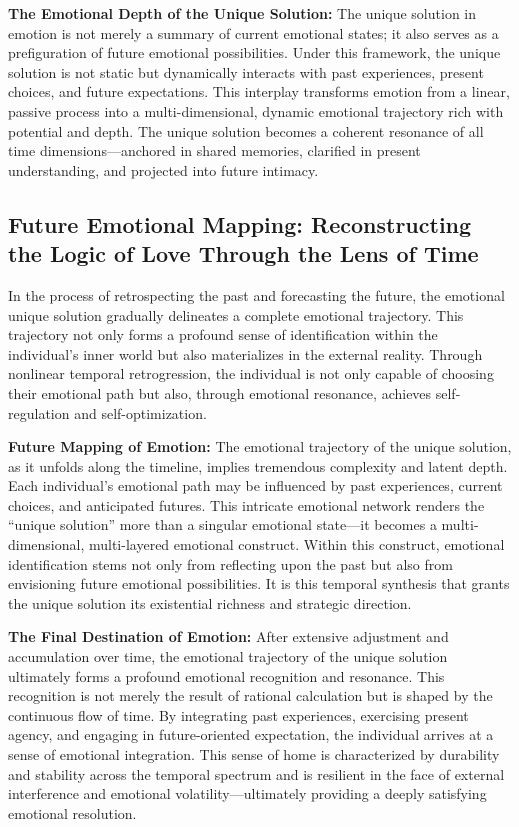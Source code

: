 \documentclass[12pt]{article}
\begin{document}
\textbf{The Emotional Depth of the Unique Solution:} The unique solution in emotion is not merely a summary of current emotional states; it also serves as a prefiguration of future emotional possibilities. Under this framework, the unique solution is not static but dynamically interacts with past experiences, present choices, and future expectations. This interplay transforms emotion from a linear, passive process into a multi-dimensional, dynamic emotional trajectory rich with potential and depth. The unique solution becomes a coherent resonance of all time dimensions—anchored in shared memories, clarified in present understanding, and projected into future intimacy.
\subsection{Future Emotional Mapping: Reconstructing the Logic of Love Through the Lens of Time}

In the process of retrospecting the past and forecasting the future, the emotional unique solution gradually delineates a complete emotional trajectory. This trajectory not only forms a profound sense of identification within the individual's inner world but also materializes in the external reality. Through nonlinear temporal retrogression, the individual is not only capable of choosing their emotional path but also, through emotional resonance, achieves self-regulation and self-optimization.

\textbf{Future Mapping of Emotion:} The emotional trajectory of the unique solution, as it unfolds along the timeline, implies tremendous complexity and latent depth. Each individual’s emotional path may be influenced by past experiences, current choices, and anticipated futures. This intricate emotional network renders the ``unique solution'' more than a singular emotional state—it becomes a multi-dimensional, multi-layered emotional construct. Within this construct, emotional identification stems not only from reflecting upon the past but also from envisioning future emotional possibilities. It is this temporal synthesis that grants the unique solution its existential richness and strategic direction.

\textbf{The Final Destination of Emotion:} After extensive adjustment and accumulation over time, the emotional trajectory of the unique solution ultimately forms a profound emotional recognition and resonance. This recognition is not merely the result of rational calculation but is shaped by the continuous flow of time. By integrating past experiences, exercising present agency, and engaging in future-oriented expectation, the individual arrives at a sense of emotional integration. This sense of home is characterized by durability and stability across the temporal spectrum and is resilient in the face of external interference and emotional volatility—ultimately providing a deeply satisfying emotional resolution.
\end{document}
